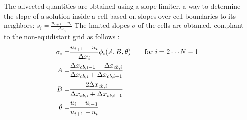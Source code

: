 \documentclass[amsmath,amssymb,a4]{revtex4-2}
\begin{document}
The advected quantities are obtained using a slope limiter, a way to determine the slope of a solution inside a cell based on slopes over cell boundaries to its neighbors: $s_{i} =  \frac{u_{i+1}-u_{i}}{\Delta x_{i}}$
The limited slopes $\sigma$ of the cells are obtained, compliant to the non-equidistant grid as follows \cite{zeng2013}:
\begin{eqnarray}
    \sigma_{i} =& \frac{u_{i+1}-u_{i}}{\Delta x_{i}} \phi_i(A,B,\theta) \quad \quad \hbox{for $i = 2 \cdots N-1$}   \\ 
    A = &  \frac{\Delta x_{cb,i-1} + \Delta x_{cb,i}}{\Delta x_{cb,i}+ \Delta x_{cb,i+1}}\\
    B = & \frac{2 \Delta x_{cb,i}}{\Delta x_{cb,i}+ \Delta x_{cb,i+1}} \\
    \theta = & \frac{u_i-u_{i-1}}{u_{i+1}-u_{i}}
\end{eqnarray}
\end{document}
